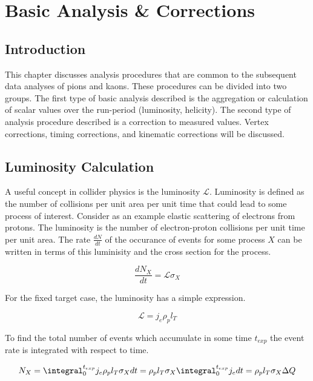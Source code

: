 \chapter{Basic Analysis \& Corrections}

\section{Introduction}
This chapter discusses analysis procedures that are common to the subsequent data analyses of pions and kaons.  These procedures can be divided into two groups.  The first type of basic analysis described is the aggregation or calculation of scalar values over the run-period (luminosity, helicity).  The second type of analysis procedure described is a correction to measured values.  Vertex corrections, timing corrections, and kinematic corrections will be discussed.


\section{Luminosity Calculation}
A useful concept in collider physics is the luminosity $\mathcal{L}$.  Luminosity is defined as the number of collisions per unit area per unit time that could lead to some process of interest.  Consider as an example elastic scattering of electrons from protons.  The luminosity is the number of electron-proton collisions per unit time per unit area.  The rate $\frac{dN}{dt}$ of the occurance of events for some process $X$ can be written in terms of this luminisity and the cross section for the process.

\begin{equation}
	\frac{dN_X}{dt} = \mathcal{L} \sigma_X 
\end{equation}

For the fixed target case, the luminosity has a simple expression.

\begin{equation}
	\mathcal{L} = j_e \rho_p l_T 
\end{equation}

To find the total number of events which accumulate in some time $t_{exp}$ the event rate is integrated with respect to time.

\begin{equation}
	N_X = \integral_{0}^{t_{exp}} j_e \rho_p l_T \sigma_X dt = \rho_p l_T \sigma_X \integral_{0}^{t_{exp}} j_e dt =  \rho_p l_T \sigma_X \Delta Q
\end{equation}

